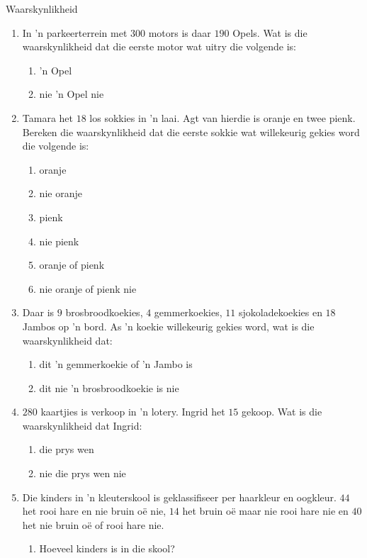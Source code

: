\begin{eocexercises}{Waarskynlikheid}
\begin{enumerate}[itemsep=5pt, label=\textbf{\arabic*}.]
  \item In 'n parkeerterrein met $300$ motors is daar $190$ Opels. Wat is die waarskynlikheid dat die eerste motor wat uitry die volgende is:
    \begin{enumerate}[noitemsep, label=\textbf{(\alph*)} ]
    \item 'n Opel
    \item nie 'n Opel nie
    \end{enumerate}
  \item Tamara het $18$ los sokkies in 'n laai. Agt van hierdie is oranje en twee pienk. Bereken die waarskynlikheid dat die eerste sokkie wat willekeurig gekies word die volgende is:
    \begin{enumerate}[noitemsep, label=\textbf{(\alph*)} ]
    \item oranje
    \item nie oranje
    \item pienk
    \item nie pienk
    \item oranje of pienk
    \item nie oranje of pienk nie
    \end{enumerate}
  \item Daar is $9$ brosbroodkoekies, $4$ gemmerkoekies,
    $11$ sjokoladekoekies en $18$ Jambos op 'n bord. As 'n koekie willekeurig gekies word, wat is die waarskynlikheid dat:
    \begin{enumerate}[noitemsep, label=\textbf{(\alph*)} ]
    \item dit 'n gemmerkoekie of 'n Jambo is
    \item dit nie 'n brosbroodkoekie is nie
    \end{enumerate}
  \item $280$ kaartjies is verkoop in 'n lotery. Ingrid het $15$ gekoop. Wat is die waarskynlikheid dat Ingrid:
    \begin{enumerate}[noitemsep, label=\textbf{(\alph*)} ]
    \item die prys wen
    \item nie die prys wen nie
    \end{enumerate}
  \item Die kinders in 'n kleuterskool is geklassifiseer per haarkleur en oogkleur. $44$ het rooi hare en nie bruin o\"e nie, $14$ het bruin o\"e maar nie rooi hare nie en $40$ het nie bruin o\"e of rooi hare nie.
    \begin{enumerate}[noitemsep, label=\textbf{(\alph*)} ]
    \item Hoeveel kinders is in die skool?

\end{enumerate}
\end{enumerate}
\end{eocexercises}
